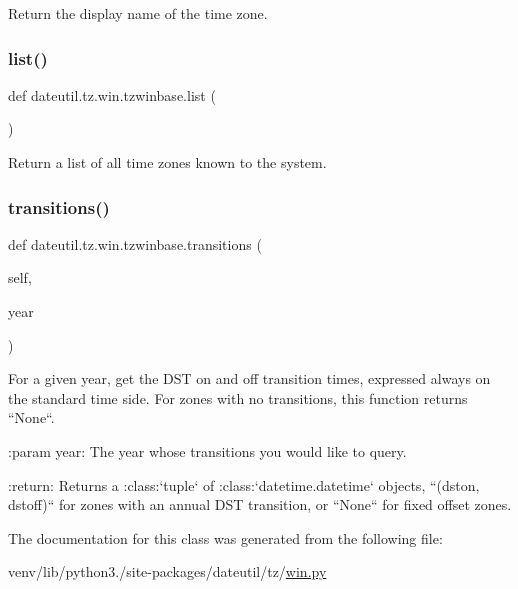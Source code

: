 \begin{DoxyVerb}Return the display name of the time zone.
\end{DoxyVerb}
 \mbox{\label{classdateutil_1_1tz_1_1win_1_1tzwinbase_a0adde8a45e76676235aae7766f7189a7}} 
\subsubsection{\texorpdfstring{list()}{list()}}
{\footnotesize\ttfamily def dateutil.\+tz.\+win.\+tzwinbase.\+list (\begin{DoxyParamCaption}{ }\end{DoxyParamCaption})\hspace{0.3cm}{\ttfamily [static]}}

\begin{DoxyVerb}Return a list of all time zones known to the system.\end{DoxyVerb}
 \mbox{\label{classdateutil_1_1tz_1_1win_1_1tzwinbase_a933b1fa2bdf0c9ab64a95ae1543d3177}} 
\subsubsection{\texorpdfstring{transitions()}{transitions()}}
{\footnotesize\ttfamily def dateutil.\+tz.\+win.\+tzwinbase.\+transitions (\begin{DoxyParamCaption}\item[{}]{self,  }\item[{}]{year }\end{DoxyParamCaption})}

\begin{DoxyVerb}For a given year, get the DST on and off transition times, expressed
always on the standard time side. For zones with no transitions, this
function returns ``None``.

:param year:
    The year whose transitions you would like to query.

:return:
    Returns a :class:`tuple` of :class:`datetime.datetime` objects,
    ``(dston, dstoff)`` for zones with an annual DST transition, or
    ``None`` for fixed offset zones.
\end{DoxyVerb}
 

The documentation for this class was generated from the following file\+:\begin{DoxyCompactItemize}
\item 
venv/lib/python3./site-\/packages/dateutil/tz/\hyperlink{win_8py}{win.\+py}\end{DoxyCompactItemize}
